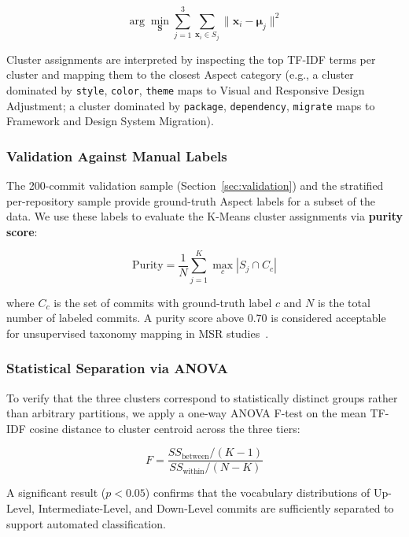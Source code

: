\documentclass{article}
\begin{document}
\begin{equation}
    \arg\min_{\mathbf{S}} \sum_{j=1}^{3} \sum_{\mathbf{x}_i \in S_j}
    \|\mathbf{x}_i - \boldsymbol{\mu}_j\|^2
\end{equation}

Cluster assignments are interpreted by inspecting the top TF-IDF terms
per cluster and mapping them to the closest Aspect category (e.g., a
cluster dominated by \texttt{style}, \texttt{color}, \texttt{theme} maps
to Visual and Responsive Design Adjustment; a cluster dominated by
\texttt{package}, \texttt{dependency}, \texttt{migrate} maps to Framework
and Design System Migration).

\subsubsection{Validation Against Manual Labels}

The 200-commit validation sample (Section~\ref{sec:validation}) and the
stratified per-repository sample provide ground-truth Aspect labels for
a subset of the data. We use these labels to evaluate the K-Means cluster
assignments via \textbf{purity score}:

\begin{equation}
    \text{Purity} = \frac{1}{N} \sum_{j=1}^{K}
    \max_{c} |S_j \cap C_c|
\end{equation}

where $C_c$ is the set of commits with ground-truth label $c$ and $N$
is the total number of labeled commits. A purity score above 0.70 is
considered acceptable for unsupervised taxonomy mapping in MSR
studies~\cite{lamine2022understanding}.

\subsubsection{Statistical Separation via ANOVA}

To verify that the three clusters correspond to statistically distinct
groups rather than arbitrary partitions, we apply a one-way ANOVA F-test
on the mean TF-IDF cosine distance to cluster centroid across the three
tiers:

\begin{equation}
    F = \frac{SS_{\text{between}} / (K-1)}{SS_{\text{within}} / (N-K)}
\end{equation}

A significant result ($p < 0.05$) confirms that the vocabulary
distributions of Up-Level, Intermediate-Level, and Down-Level commits
are sufficiently separated to support automated classification.
\end{document}
